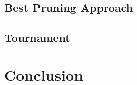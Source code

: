 \documentclass[conference]{IEEEtran}
\begin{document}
\subsection{Best Pruning Approach}

\subsection{Tournament}

\section{Conclusion}



\end{document}
